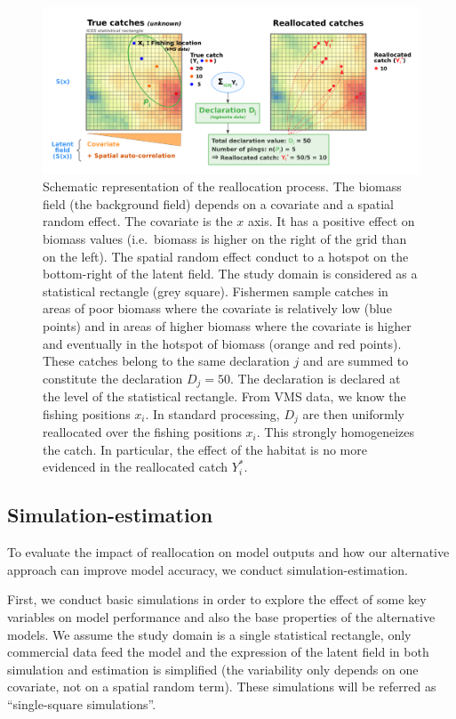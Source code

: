 \documentclass[
  english,
  man,floatsintext]{apa6}
\begin{document}
\begin{figure}
\centering
\includegraphics{images/realloc.png}
\caption{\label{fig:SchemeRealloc} Schematic representation of the reallocation process. The biomass field (the background field) depends on a covariate and a spatial random effect. The covariate is the \(x\) axis. It has a positive effect on biomass values (i.e.~biomass is higher on the right of the grid than on the left). The spatial random effect conduct to a hotspot on the bottom-right of the latent field. The study domain is considered as a statistical rectangle (grey square). Fishermen sample catches in areas of poor biomass where the covariate is relatively low (blue points) and in areas of higher biomass where the covariate is higher and eventually in the hotspot of biomass (orange and red points). These catches belong to the same declaration \(j\) and are summed to constitute the declaration \(D_j=50\). The declaration is declared at the level of the statistical rectangle. From VMS data, we know the fishing positions \(x_i\). In standard processing, \(D_j\) are then uniformly reallocated over the fishing positions \(x_i\). This strongly homogeneizes the catch. In particular, the effect of the habitat is no more evidenced in the reallocated catch \(Y_i^*\).}
\end{figure}

\hypertarget{simulation-estimation}{%
\subsection{Simulation-estimation}\label{simulation-estimation}}

To evaluate the impact of reallocation on model outputs and how our alternative approach can improve model accuracy, we conduct simulation-estimation.

First, we conduct basic simulations in order to explore the effect of some key variables on model performance and also the base properties of the alternative models. We assume the study domain is a single statistical rectangle, only commercial data feed the model and the expression of the latent field in both simulation and estimation is simplified (the variability only depends on one covariate, not on a spatial random term). These simulations will be referred as \enquote{single-square simulations}.
\end{document}
